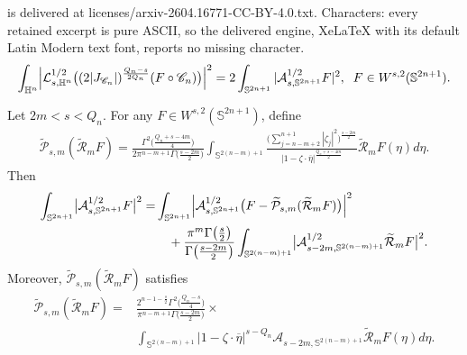 \documentclass[10pt,a4paper]{amsart}
\begin{document}
is delivered at licenses/arxiv-2604.16771-CC-BY-4.0.txt. Characters: every retained excerpt is pure ASCII, so the delivered engine, XeLaTeX with its default Latin Modern text font, reports no missing character.
\begin{align}\label{a2.6}
\int_{\mathbb{H}^{n}}\Bigl|\mathcal{L}_{s,\mathbb{H}^{n}}^{1/2}
\bigl( (2|J_{\mathscr{C}_{n}}|)^{\frac{Q_n-s}{2Q_n}} (F \circ \mathscr{C}_{n}) \bigr)\Bigr|^{2}
= 2\int_{\mathbb{S}^{2n+1}} |\mathcal{A}_{s,\mathbb{S}^{2n+1}}^{1/2} F|^{2},
\;\; F \in W^{s,2}(\mathbb{S}^{2n+1}).
\end{align}

\begin{lemma}\label{lm4.3}
Let \(2m < s < Q_n\). For any \(F \in W^{s,2}(\mathbb{S}^{2n+1})\), define
\begin{align}\label{b3.2}
\widetilde{\mathcal{P}}_{s,m}(\widetilde{\mathcal{R}}_{m}F)
=
\frac{\Gamma^{2}\bigl(\frac{Q_n+s-4m}{4}\bigr)}
{2\pi^{n-m+1}\Gamma\bigl(\frac{s-2m}{2}\bigr)}
\int_{\mathbb{S}^{2(n-m)+1}} \frac{\bigl(\sum\limits_{j=n-m+2}^{n+1}|\zeta_{j}|^{2}\bigr)^{\frac{s-2m}{2}}}
{|1-\zeta\cdot\overline{\eta}|^{\frac{Q_n+s-4m}{2}}}
\widetilde{\mathcal{R}}_{m}F(\eta)d\eta .
\end{align}
Then
\begin{align}\nonumber
\int_{\mathbb{S}^{2n+1}}\bigl|\mathcal{A}_{s,\mathbb{S}^{2n+1}}^{1/2}F\bigr|^{2}
=& \int_{\mathbb{S}^{2n+1}}\Bigl|\mathcal{A}_{s,\mathbb{S}^{2n+1}}^{1/2}\bigl(F-
\widetilde{\mathcal{P}}_{s,m}(\widetilde{\mathcal{R}}_{m}F)\bigr)\Bigr|^{2} \\
\label{b4.3}
&\quad + \frac{\pi^{m}\Gamma\bigl(\frac{s}{2}\bigr)}{\Gamma\bigl(\frac{s-2m}{2}\bigr)}
\int_{\mathbb{S}^{2(n-m)+1}}\bigl|\mathcal{A}_{s-2m,\mathbb{S}^{2(n-m)+1}}^{1/2}
\widetilde{\mathcal{R}}_{m}F\bigr|^{2}.
\end{align}
Moreover, $\widetilde{\mathcal{P}}_{s,m}(\widetilde{\mathcal{R}}_{m}F)$ satisfies
\begin{align}\nonumber
\widetilde{\mathcal{P}}_{s,m}(\widetilde{\mathcal{R}}_{m}F)
= &\frac{2^{n-1-\frac{s}{2}}\Gamma^{2}\bigl(\frac{Q_n-s}{4}\bigr)}
{\pi^{n-m+1}\Gamma\bigl(\frac{s-2m}{2}\bigr)}\times\\
\label{4.3}
&
\int_{\mathbb{S}^{2(n-m)+1}}|1-\zeta\cdot\overline{\eta}|^{s-Q_n}
\mathcal{A}_{s-2m,\mathbb{S}^{2(n-m)+1}}\widetilde{\mathcal{R}}_{m}F(\eta)d\eta .
\end{align}
\end{lemma}
\end{document}
